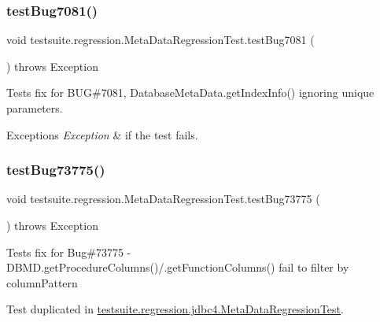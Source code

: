 \subsubsection{\texorpdfstring{test\+Bug7081()}{testBug7081()}}
{\footnotesize\ttfamily void testsuite.\+regression.\+Meta\+Data\+Regression\+Test.\+test\+Bug7081 (\begin{DoxyParamCaption}{ }\end{DoxyParamCaption}) throws Exception}

Tests fix for B\+UG\#7081, Database\+Meta\+Data.\+get\+Index\+Info() ignoring \textquotesingle{}unique\textquotesingle{} parameters.


\begin{DoxyExceptions}{Exceptions}
{\em Exception} & if the test fails. \\
\hline
\end{DoxyExceptions}
\mbox{\label{classtestsuite_1_1regression_1_1_meta_data_regression_test_ab626be438fcdf7bbb6d528f00a7dda1d}} 
\subsubsection{\texorpdfstring{test\+Bug73775()}{testBug73775()}}
{\footnotesize\ttfamily void testsuite.\+regression.\+Meta\+Data\+Regression\+Test.\+test\+Bug73775 (\begin{DoxyParamCaption}{ }\end{DoxyParamCaption}) throws Exception}

Tests fix for Bug\#73775 -\/ D\+B\+M\+D.\+get\+Procedure\+Columns()/.get\+Function\+Columns() fail to filter by column\+Pattern

Test duplicated in \mbox{\hyperlink{classtestsuite_1_1regression_1_1jdbc4_1_1_meta_data_regression_test}{testsuite.\+regression.\+jdbc4.\+Meta\+Data\+Regression\+Test}}. \mbox{\label{classtestsuite_1_1regression_1_1_meta_data_regression_test_a59b663373c79eec136ca0c2473dac25c}} 
